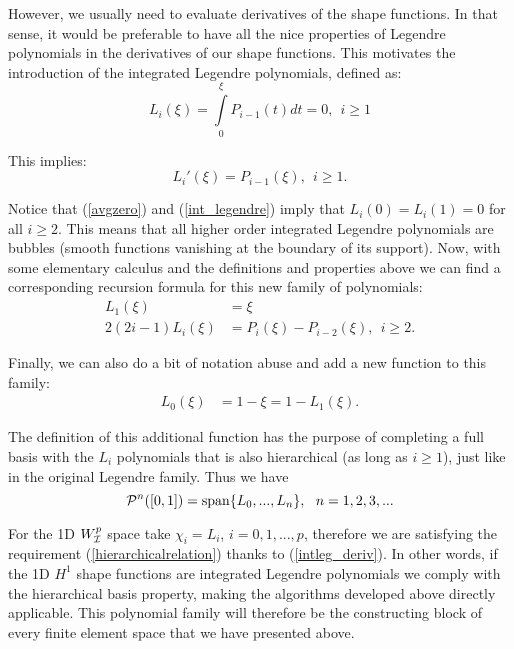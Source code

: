 However, we usually need to evaluate derivatives of the shape functions. In that sense, it would be preferable to have all the nice properties of Legendre polynomials in the derivatives of our shape functions. This motivates the introduction of the integrated Legendre polynomials, defined as:
% 
\begin{equation}
    L_i(\xi)=\int\limits_0^\xi P_{i-1}(t)dt=0,\ \ i\geq 1 \label{int_legendre}
\end{equation}

\noindent This implies:
% 
\begin{equation}
    L_i'(\xi)=P_{i-1}(\xi),\ \ i\geq 1. \label{intleg_deriv}
\end{equation}

Notice that (\ref{avgzero}) and (\ref{int_legendre}) imply that $L_i(0)=L_i(1)=0$ for all $i\geq 2$. This means that all higher order integrated Legendre polynomials are bubbles (smooth functions vanishing at the boundary of its support). Now, with some elementary calculus and the definitions and properties above we can find a corresponding recursion formula for this new family of polynomials:
% 
\begin{align}
    L_1(\xi)&=\xi \\
    2(2i-1)L_i(\xi)&=P_i(\xi)-P_{i-2}(\xi),\ \ i\geq 2.\label{intlegendre_rec}
\end{align}

Finally, we can also do a bit of notation abuse and add a new function to this family:
% 
\begin{align}
    L_0(\xi)&=1-\xi=1-L_1(\xi). \label{affine0}
\end{align}

The definition of this additional function has the purpose of completing a full basis with the $L_i$ polynomials that is also hierarchical (as long as $i\geq 1$), just like in the original Legendre family. Thus we have
% 
\begin{equation}
    \mcP^n([0,1])=\spann\{L_0,...,L_n\},\ \ n=1,2,3,...\label{hier_intleg}
\end{equation}

For the 1D $W^p_{\mathcal{I}}$ space take $\chi_i=L_i$, $i=0,1,...,p$, therefore we are satisfying the requirement (\ref{hierarchicalrelation}) thanks to (\ref{intleg_deriv}). In other words, if the 1D $H^1$ shape functions are integrated Legendre polynomials we comply with the hierarchical basis property, making the algorithms developed above directly applicable. 
This polynomial family will therefore be the constructing block of every finite element space that we have presented above.

